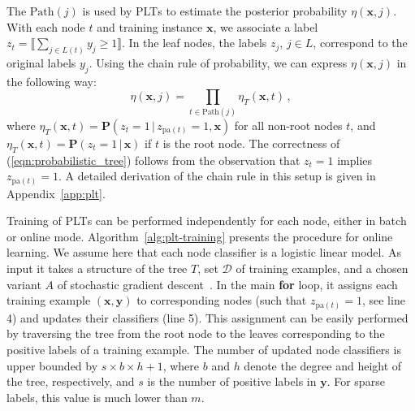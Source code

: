 \documentclass{article}
\newcommand{\Algo}[1]{\textsc{#1}}
\renewcommand{\vec}[1]{\boldsymbol{#1}}
\newcommand{\bx}{\vec{x}}
\newcommand{\by}{\vec{y}}
\newcommand{\calD}{\mathcal{D}}
\newcommand{\heta}{\hat{\eta}}
\newcommand{\pa}[1]{\mathrm{pa}(#1)}
\newcommand{\Path}[1]{\mathrm{Path}(#1)}
\newcommand{\prob}{\mathbf{P}}
\newcommand{\assert}[1]{\llbracket #1 \rrbracket}
\newcommand{\given}{\, | \,}
\begin{document}
The $\Path{j}$ is used by \Algo{PLT}s to estimate the posterior probability $\eta(\bx, j)$.
With each node $t$ and training instance $\bx$, we associate a label $z_t = \assert{\textstyle \sum_{j \in L(t)} y_j \ge 1}$.
In the leaf nodes, the labels $z_j$, $j \in L$, correspond to the original labels $y_j$.
Using the chain rule of probability, we can express $\eta(\bx, j)$ in the following way:
\begin{equation}
\eta(\bx, j) = \prod_{t \in \Path{j}} \eta_T(\bx, t)\,,
\label{eqn:probabilistic_tree}
\end{equation}
where $\eta_T(\bx, t) = \prob(z_t = 1 \given z_{\pa{t}} =1, \bx)$ for all non-root nodes $t$, and $\eta_T(\bx, t) = \prob(z_t = 1 \given \bx)$ if $t$ is the root node. 
The correctness of (\ref{eqn:probabilistic_tree}) follows from the observation that $z_{t} = 1$ implies $z_{\pa{t}} = 1$. A detailed derivation of the chain rule in this setup is given in Appendix~\ref{app:plt}.

Training of \Algo{PLT}s can be performed independently for each node, either in batch or online mode.  Algorithm~\ref{alg:plt-training} presents the procedure for online learning. We assume here that each node classifier is a logistic linear model. As input it takes a structure of the tree $T$, set $\calD$ of training examples, and a chosen variant $A$ of stochastic gradient descent~\cite{Bottou_2010}. In the main \textbf{for} loop, it assigns each training example $(\bx, \by)$ to corresponding nodes (such that  $z_{\pa{t}} = 1$, see line 4) and updates their classifiers (line 5). This assignment can be easily performed by traversing the tree from the root node to the leaves corresponding to the positive labels of a training example. The number of updated node classifiers is upper bounded by $s \times b \times h+1$, where $b$ and $h$ denote the degree and height of the tree, respectively, and $s$ is the number of positive labels in $\by$. For sparse labels, this value is much lower than $m$.


\end{document}
